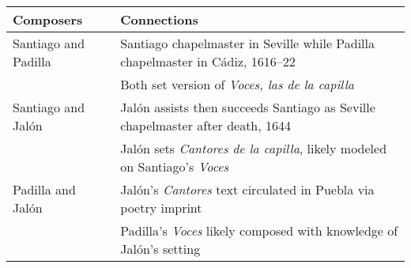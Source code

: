 \documentclass{aac-table}
\newcommand{\tabitem}{\textbullet\enspace}
\begin{document}
\small
\begin{tabulary}{\textwidth}{lL}
    \toprule
    Composers & Connections\\ \midrule

    Santiago and Padilla
    & \tabitem Santiago chapelmaster in Seville while Padilla chapelmaster in Cádiz,
    1616--22 \\
    & \tabitem Both set version of \emph{Voces, las de la capilla} \\ \addlinespace
    
    Santiago and Jalón
    & \tabitem Jalón assists then succeeds Santiago as Seville chapelmaster after death,
    1644 \\
    & \tabitem Jalón sets \emph{Cantores de la capilla}, likely modeled on Santiago's
    \emph{Voces} \\ \addlinespace

    Padilla and Jalón 
    & \tabitem Jalón's \emph{Cantores} text circulated in Puebla via poetry imprint \\
    & \tabitem Padilla's \emph{Voces} likely composed with knowledge of Jalón's setting \\
    \bottomrule
\end{tabulary}
\end{document}
